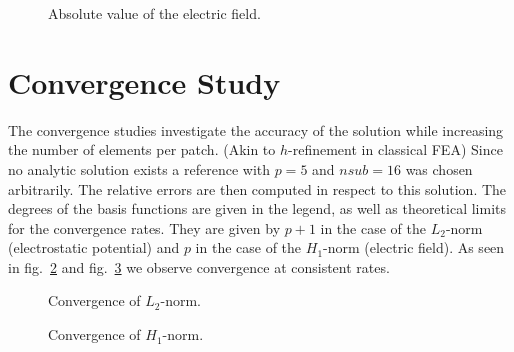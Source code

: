 \begin{center}
\begin{figure}[H]
  
  \caption{Absolute value of the electric field.}
  \label{fig:electric_field}
\end{figure}
\end{center}

\section{Convergence Study}
The convergence studies investigate the accuracy of the solution while increasing the number of elements per patch. (Akin to $h$-refinement in classical FEA) Since no analytic solution exists a reference with $p=5$ and $nsub=16$ was chosen arbitrarily. The relative errors are then computed in respect to this solution.
The degrees of the basis functions are given in the legend, as well as theoretical limits for the convergence rates. They are given by $p+1$ in the case of the $L_2$-norm (electrostatic potential) and $p$ in the case of the $H_1$-norm (electric field). As seen in fig.~\ref{fig:convergence_potential} and fig.~\ref{fig:convergence_gradient} we observe convergence at consistent rates.

\begin{figure}[H]
  
  \caption{Convergence of $L_2$-norm.}
  \label{fig:convergence_potential}
\end{figure}

\begin{figure}[H]
  
  \caption{Convergence of $H_1$-norm.}
  \label{fig:convergence_gradient}
\end{figure}
